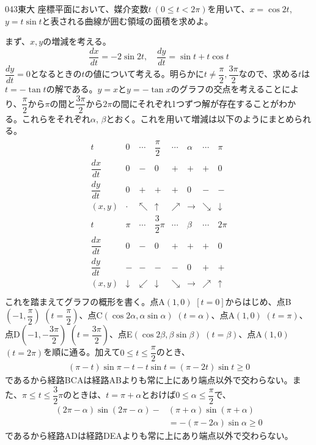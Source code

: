 \begin{prob}{043}{\maru}{東大}
 座標平面において、媒介変数$t~(0\le t< 2\pi)$を用いて、$x=\cos2t$, $y=t\sin t$と表される曲線が囲む領域の面積を求めよ。
\end{prob}
まず、$x, y$の増減を考える。
\[ \frac{dx}{dt}=-2\sin 2t, \quad  \frac{dy}{dt}=\sin t+t\cos t \]
$\dfrac{dy}{dt}=0$となるときの$t$の値について考える。明らかに$t\neq \dfrac{\pi}{2}, \dfrac{3\pi}{2}$なので、求める$t$は$t=-\tan t$の解である。$y=x$と$y=-\tan x$のグラフの交点を考えることにより、$\dfrac{\pi}{2}$から$\pi$の間と$\dfrac{3\pi}{2}$から$2\pi$の間にそれぞれ1つずつ解が存在することがわかる。これらをそれぞれ$\alpha$, $\beta$とおく。これを用いて増減は以下のようにまとめられる。
\begin{align*}
\begin{array}{c|c|c|c|c|c|c|c}
 t & 0 & \cdots & \dfrac{\pi}{2} & \cdots & \alpha & \cdots & \pi \\[1.0ex] \hline
 \dfrac{dx}{dt} & 0 & - & 0 & + & + & + & 0 \\[1.0ex] \hline
 \dfrac{dy}{dt} & 0 & + & + & + & 0 & - & - \\[1.0ex] \hline
 (x, y) & \cdot & \nwarrow & \uparrow & \nearrow & \to & \searrow & \downarrow \\ \hline\hline
 t & \pi & \cdots & \dfrac{3}{2}\pi & \cdots & \beta & \cdots & 2\pi \\[1.0ex] \hline
 \dfrac{dx}{dt} & 0 & - & 0 & + & + & + & 0 \\[1.0ex] \hline
 \dfrac{dy}{dt} & - & - & - & - & 0 & + & + \\[1.0ex] \hline
 (x, y) & \downarrow & \swarrow & \downarrow & \searrow & \to & \nearrow & \uparrow \\
 \end{array}
\end{align*}
これを踏まえてグラフの概形を書く。点A$(1, 0)$ $[t=0]$からはじめ、点B$\left(-1, \dfrac{\pi}{2}\right)$ $\left(t=\dfrac{\pi}{2}\right)$、点C$(\cos2\alpha, \alpha\sin\alpha)$ $(t=\alpha)$、点A$(1, 0)$ $(t=\pi)$、点D$\left(-1, -\dfrac{3\pi}{2}\right)$ $\left(t=\dfrac{3\pi}{2}\right)$、点E$(\cos2\beta, \beta\sin\beta)$ $(t=\beta)$、点A$(1, 0)$ $(t=2\pi)$を順に通る。加えて$0\le t \le \dfrac{\pi}{2}$のとき、
\begin{align*}
 (\pi-t)\sin{\pi-t}-t\sin t=(\pi-2t)\sin t \ge 0
\end{align*}
であるから経路BCAは経路ABよりも常に上にあり端点以外で交わらない。また、$\pi\le t\le \dfrac{3}{2}\pi$のときは、$t=\pi+\alpha$とおけば$0\le\alpha\le\dfrac{\pi}{2}$で、
\begin{align*}
 (2\pi-\alpha)\sin(2\pi-\alpha)-&(\pi+\alpha)\sin(\pi+\alpha) \\
 &=-(\pi-2\alpha)\sin\alpha \ge 0
\end{align*}
であるから経路ADは経路DEAよりも常に上にあり端点以外で交わらない。

